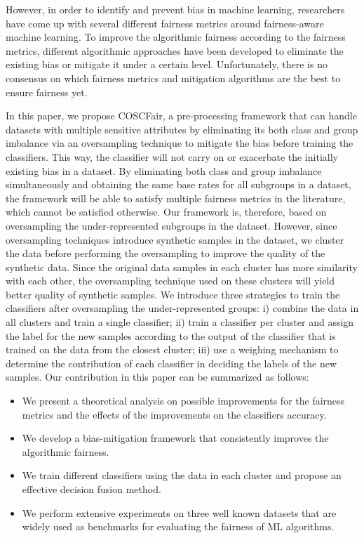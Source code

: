 However, in order to identify and prevent bias in machine learning, researchers have come up with several different fairness metrics around fairness-aware machine learning. To improve the algorithmic fairness according to the fairness metrics, different algorithmic approaches have been developed  to eliminate the existing bias or mitigate it under a certain level. Unfortunately, there is no consensus on which fairness metrics and mitigation algorithms are the best to ensure fairness yet.


In this paper, we propose COSCFair, a pre-processing framework that can handle datasets with multiple sensitive attributes by eliminating its both class and group imbalance via an oversampling technique to mitigate the bias before training the classifiers. This way, the classifier will not carry on or exacerbate the initially existing bias in a dataset. By eliminating both class and group imbalance simultaneously and obtaining the same base rates for all subgroups in a dataset, the framework will be able to satisfy multiple fairness metrics in the literature, which cannot be satisfied otherwise. Our framework is, therefore, based on oversampling the under-represented subgroups in the dataset. However, since oversampling techniques introduce synthetic samples in the dataset, we cluster the data before performing the oversampling to improve the quality of the synthetic data. Since the original data samples in each cluster has more similarity with each other, the oversampling technique used on these clusters will yield better quality of synthetic samples. We introduce three strategies to train the classifiers after oversampling the under-represented groups: 
i) combine the data in all clusters and train a single classifier; 
ii) train a classifier per cluster and assign the label for the new samples according to the output of the classifier that is trained on the data from the closest cluster; 
iii) use a weighing mechanism to determine the contribution of each classifier in deciding the labels of the new samples. Our contribution in this paper can be summarized as follows:
\begin{itemize}
    \item We present a theoretical analysis on possible improvements for the fairness metrics and the effects of the improvements on the classifiers accuracy.
    \item We develop a bias-mitigation framework that consistently improves the algorithmic fairness. 
    \item We train different classifiers using the data in each cluster and propose an effective decision fusion method. 
    \item We perform extensive experiments on three well known datasets that are widely used as benchmarks for evaluating the fairness of ML algorithms.
    
\end{itemize}


